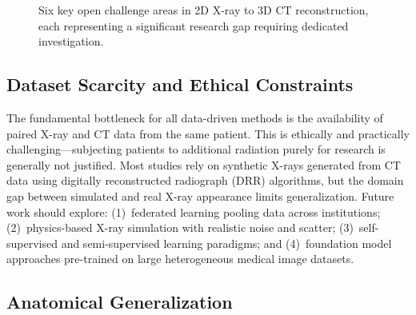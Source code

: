 \documentclass[10pt,twocolumn,a4paper]{article}
\begin{document}
\begin{figure}[h]
\centering
{}
\caption{Six key open challenge areas in 2D X-ray to 3D CT reconstruction,
each representing a significant research gap requiring dedicated investigation.}
\label{fig:challenges_overview}
\end{figure}

\subsection{Dataset Scarcity and Ethical Constraints}
\label{sec:challenges:data}

The fundamental bottleneck for all data-driven methods is the availability of
paired X-ray and CT data from the same patient. This is ethically and
practically challenging---subjecting patients to additional radiation purely for
research is generally not justified. Most studies rely on synthetic X-rays
generated from CT data using digitally reconstructed radiograph (DRR)
algorithms, but the domain gap between simulated and real X-ray appearance
limits generalization. Future work should explore: (1)~federated learning pooling
data across institutions; (2)~physics-based X-ray simulation with realistic noise
and scatter; (3)~self-supervised and semi-supervised learning paradigms; and
(4)~foundation model approaches pre-trained on large heterogeneous medical image
datasets.

\subsection{Anatomical Generalization}
\label{sec:challenges:anatomy}
\end{document}
